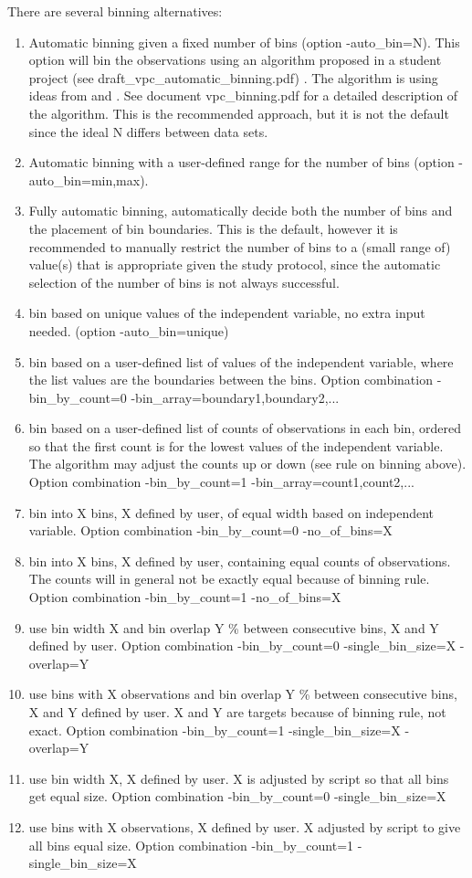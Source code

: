 There are several binning alternatives:
\begin{enumerate}
	\item Automatic binning given a fixed number of bins (option -auto\_bin=N). This option 
will bin the observations using an algorithm proposed in a student project (see draft\_vpc\_automatic\_binning.pdf) \cite{Sonehag}. The algorithm is using ideas from \cite{Calinski} and \cite{Lavielle}. 
See document vpc\_binning.pdf for a detailed description of the algorithm.
This is the recommended approach, but it is not the default since the ideal N differs between data sets.
	\item Automatic binning with a user-defined range for the number of bins (option -auto\_bin=min,max). 
	\item Fully automatic binning, automatically decide both the number of bins and the placement of bin boundaries.
This is the default, however it is recommended to manually restrict the number of bins to a (small range of) value(s)
that is appropriate given the study protocol, since the automatic selection of the number of bins \cite{Sonehag} 
is not always 
successful.
	\item bin based on unique values of the independent variable, no extra input needed. (option -auto\_bin=unique)
	\item bin based on a user-defined list of values of the independent variable, where the list values are the boundaries between the bins. Option combination -bin\_by\_count=0 -bin\_array=boundary1,boundary2,...
	\item bin based on a user-defined list of counts of observations in each bin, ordered so that the first count is for the lowest values of the independent variable. The algorithm may adjust the counts up or down (see rule on binning above). Option combination  -bin\_by\_count=1 -bin\_array=count1,count2,...
	\item bin into X bins, X defined by user, of equal width based on independent variable. Option combination -bin\_by\_count=0 -no\_of\_bins=X
	\item bin into X bins, X defined by user, containing equal counts of observations. The counts will in general not be exactly equal because of binning rule. Option combination -bin\_by\_count=1 -no\_of\_bins=X
	\item use bin width X and bin overlap Y \% between consecutive bins, X and Y defined by user. Option combination -bin\_by\_count=0 -single\_bin\_size=X -overlap=Y
	\item use bins with X observations and bin overlap Y \% between consecutive bins, X and Y defined by user.  X and Y are targets because of binning rule, not exact. Option combination -bin\_by\_count=1 -single\_bin\_size=X -overlap=Y
	\item use bin width X, X defined by user. X is adjusted by script so that all bins get equal size. Option combination -bin\_by\_count=0 -single\_bin\_size=X
	\item use bins with X observations, X defined by user.  X adjusted by script to give all bins equal size. Option combination -bin\_by\_count=1 -single\_bin\_size=X
\end{enumerate}

